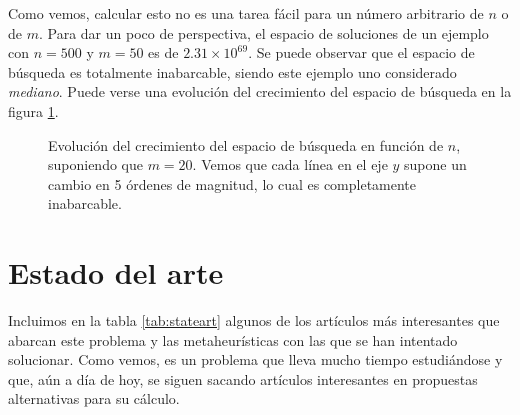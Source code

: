 Como vemos, calcular esto no es una tarea fácil para un número arbitrario de $n$ o de $m$. Para dar un poco de perspectiva, el espacio de soluciones de un ejemplo con $n = 500$ y $m = 50$ es de $2.31 \times 10^{69}$. Se puede observar que el espacio de búsqueda es totalmente inabarcable, siendo este ejemplo uno considerado \textit{mediano}. Puede verse una evolución del crecimiento del espacio de búsqueda en la figura \ref{fig:binom}.

\begin{figure}[h]
    \centering
    
    
        \caption{Evolución del crecimiento del espacio de búsqueda en función de $n$, suponiendo que $m = 20$. Vemos que cada línea en el eje $y$ supone un cambio en 5 órdenes de magnitud, lo cual es completamente inabarcable.}
        \label{fig:binom}
    
\end{figure}

\section{Estado del arte}
Incluimos en la tabla \ref{tab:stateart} algunos de los artículos más interesantes que abarcan este problema y las metaheurísticas con las que se han intentado solucionar. Como vemos, es un problema que lleva mucho tiempo estudiándose y que, aún a día de hoy, se siguen sacando artículos interesantes en propuestas alternativas para su cálculo.

